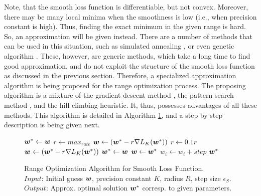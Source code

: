 Note, that the smooth loss function is differentiable, but not convex. Moreover, there may be many local minima when the smoothness is low (i.e., when precision constant is high). Thus, finding the exact minimum in the given range is hard. So, an approximation will be given instead. There are a number of methods that can be used in this situation, such as simulated annealing \cite{Kirkpatrick}, or even genetic algorithm \cite{Goldberg}. These, however, are generic methods, which take a long time to find good approximation, and do not exploit the structure of the smooth loss function as discussed in the previous section. Therefore, a specialized approximation algorithm is being proposed for the range optimization process. The proposing algorithm is a mixture of the gradient descent method \cite{Cauchy}, the pattern search method \cite{Hooke}, and the hill climbing heuristic. It, thus, possesses advantages of all these methods. This algorithm is detailed in Algorithm \ref{alg:sla.range}, and a step by step description is being given next. 

\begin{figure}
\caption{
Range Optimization Algorithm for Smooth Loss Function. \\
\text{\hspace{2.1cm}} $Input$: Initial guess $\boldsymbol{w}$, precision constant $K$, radius $R$, step size $\epsilon_S$. \\
\text{\hspace{2.1cm}} $Output$: Approx. optimal solution $\boldsymbol{w}^*$ corresp. to given parameters.
}
\label{alg:sla.range}
\begin{algorithmic}[1]
 
\Repeat
   \Statex {}
   \State $\boldsymbol{w}^* \gets \boldsymbol{w}$
   \Repeat
      \State $r \gets max_{rate}$
      \State $\boldsymbol{w} \gets (\boldsymbol{w}^* - r \nabla L_K(\boldsymbol{w}^*))$
         \State $r \gets 0.1 r$
         \State $\boldsymbol{w} \gets (\boldsymbol{w}^* - r\nabla L_K(\boldsymbol{w}^*))$
      \EndWhile
         \State $\boldsymbol{w}^* \gets \boldsymbol{w}$
      \EndIf
   \Statex {}
         \State $\boldsymbol{w} \gets \boldsymbol{w}^*$  
         \State $w_i \gets w_i + step$
         \EndIf       
      \EndFor
   \EndFor
   \Statex
{}
\State \Return $\boldsymbol{w}^*$
\EndFunction
\end{algorithmic}
\end{figure}


